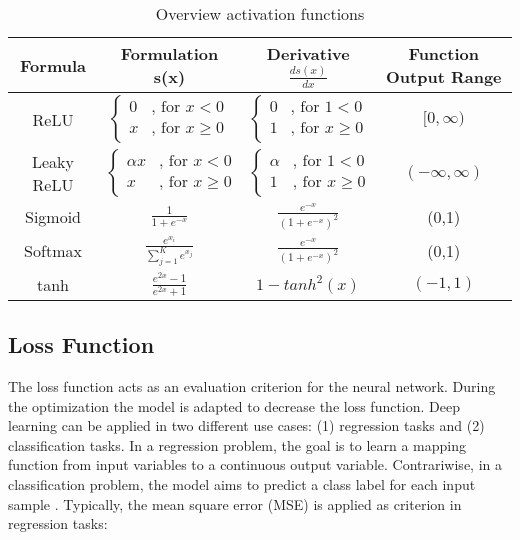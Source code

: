 \begin {table}[H]
\begin{tabular}{ c c c c }
\toprule 
Formula & Formulation s(x) & Derivative $\frac{ds(x)}{dx}$ & Function Output Range \\
\midrule 
ReLU &   $\begin{cases} 0 & \text{, for }x < 0\\
	x & \text{, for }x \geqslant 0 \end{cases}$ & $\begin{cases} 0 & \text{, for }1 < 0\\
	1 & \text{, for }x \geqslant 0 \end{cases}$ & $[ 0, \infty)$\\

\rule{0pt}{5ex}%

Leaky ReLU &   $\begin{cases} \alpha x & \text{, for }x < 0\\
	x & \text{, for }x \geqslant 0 \end{cases}$ & $\begin{cases} \alpha & \text{, for }1 < 0\\
	1 & \text{, for }x \geqslant 0 \end{cases}$ & $(- \infty, \infty)$\\

\rule{0pt}{5ex}%

Sigmoid & $\frac{1}{1+e^{-x}}$ & $\frac{e^{-x}}{(1+e^{-x})^{2}}$ & (0,1)\\

\rule{0pt}{5ex}%

Softmax & $\frac{e^{x_{i}}}{\sum_{j=1}^{K} e^{x_{j}}}$ & $\frac{e^{-x}}{(1+e^{-x})^{2}}$ & (0,1)\\

\rule{0pt}{5ex}%

tanh & $\frac{e^{2x}-1}{e^{2x}+1}$ & $1-tanh^{2}(x)$ & $(-1,1)$ \\
\bottomrule  

\end{tabular}
\caption {Overview activation functions \cite{ShilohPerl2020}} \label{tab:activation_functions}
\end {table}


\subsection{Loss Function}
The loss function acts as an evaluation criterion for the neural network. During the optimization the model is adapted to decrease the loss function. Deep learning can be applied in two different use cases: (1) regression tasks and (2) classification tasks. In a regression problem, the goal is to learn a mapping function from input variables to a continuous output variable. Contrariwise, in a classification problem, the model aims to predict a class label for each input sample \cite{ShilohPerl2020}. Typically, the mean square error (MSE) is applied as criterion in regression tasks:

